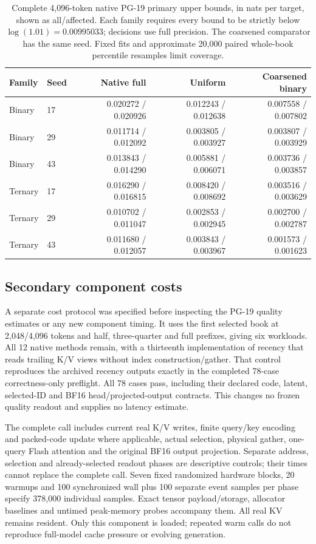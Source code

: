 \documentclass[11pt]{article}
\begin{document}
\begin{table}[htbp]
\centering\small
\begin{tabular}{llrrr}
\toprule
Family & Seed & Native full & Uniform & Coarsened binary \\
\midrule
Binary & 17 & 0.020272 / 0.020926 & 0.012243 / 0.012638 & 0.007558 / 0.007802 \\
Binary & 29 & 0.011714 / 0.012092 & 0.003805 / 0.003927 & 0.003807 / 0.003929 \\
Binary & 43 & 0.013843 / 0.014290 & 0.005881 / 0.006071 & 0.003736 / 0.003857 \\
Ternary & 17 & 0.016290 / 0.016815 & 0.008420 / 0.008692 & 0.003516 / 0.003629 \\
Ternary & 29 & 0.010702 / 0.011047 & 0.002853 / 0.002945 & 0.002700 / 0.002787 \\
Ternary & 43 & 0.011680 / 0.012057 & 0.003843 / 0.003967 & 0.001573 / 0.001623 \\
\bottomrule
\end{tabular}
\caption{Complete 4,096-token native PG-19 primary upper bounds,
in nats per target, shown as all/affected. Each family requires every bound
to be strictly below \(\log(1.01)=0.00995033\); decisions use full precision.
The coarsened comparator has the same seed. Fixed fits and approximate
20,000 paired whole-book percentile resamples limit coverage.}
\label{tab:native-pg19-4096}
\end{table}


\subsection{Secondary component costs}
\label{sec:native-cost}

A separate cost protocol was specified before inspecting the PG-19 quality
estimates or any new component timing. It uses the first selected book at
2,048/4,096 tokens and half, three-quarter and full prefixes, giving six
workloads. All 12 native methods remain, with a thirteenth implementation
of recency that reads trailing K/V views without index construction/gather.
That control reproduces the archived recency outputs exactly in the completed
78-case correctness-only preflight. All 78 cases pass, including their
declared code, latent, selected-ID and BF16 head/projected-output contracts.
This changes no frozen quality readout and supplies no latency estimate.

The complete call includes current real K/V writes, finite query/key encoding
and packed-code update where applicable, actual selection, physical gather,
one-query Flash attention and the original BF16 output projection. Separate
address, selection and already-selected readout phases are descriptive controls;
their times cannot replace the complete call. Seven fixed randomized hardware
blocks, 20 warmups and 100 synchronized wall plus 100 separate event samples
per phase specify 378,000 individual samples. Exact tensor payload/storage,
allocator baselines and untimed peak-memory probes accompany them.
All real KV remains resident. Only this component is loaded; repeated warm
calls do not reproduce full-model cache pressure or evolving generation.
\end{document}
